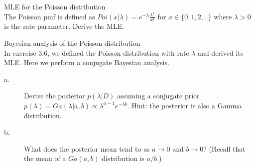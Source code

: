 \documentclass[a4paper,twoside=false,abstract=false,numbers=noenddot,
titlepage=false,headings=small,parskip=half,version=last]{scrartcl}
\begin{document}
\begin{exercise}{3.6} MLE for the Poisson distribution \\
    The Poisson pmf is defined as
    $Poi(x|\lambda)=e^{-\lambda}\frac{\lambda^x}{x!}$ for $x \in \{0,1,2,..\}$
    where $\lambda>0$ is the rate parameter. Derive the MLE. 
\end{exercise}
\begin{solution}

\end{solution}

\begin{exercise}{3.7} Bayesian analysis of the Poisson distribution \\
    In exercise 3.6, we defined the Poisson distribution with rate $\lambda$
    and derived its MLE. Here we perform a conjugate Bayesian analysis. 
    \begin{description}
        \item[a.] Derive the posterior $p(\lambda|D)$ assuming a conjugate
            prior $p(\lambda)=Ga(\lambda|a,b)\propto
            \lambda^{a-1}e^{-\lambda b}$. Hint: the posterior is also a Gamma
            distribution. 
        \item[b.] What does the posterior mean tend to as $a\rightarrow 0$ and
            $b\rightarrow 0$? (Recall that the mean of a $Ga(a,b)$ distribution
            is $a/b$.)
    \end{description}
\end{exercise}
\begin{solution}

\end{solution}

\end{document}

